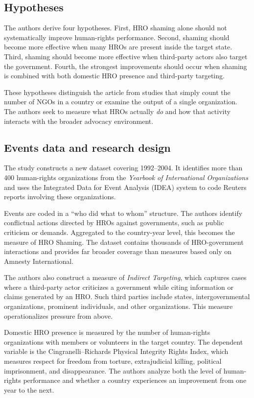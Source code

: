 \subsection{Hypotheses}

The authors derive four hypotheses. First, HRO shaming alone should not systematically improve human-rights performance. Second, shaming should become more effective when many HROs are present inside the target state. Third, shaming should become more effective when third-party actors also target the government. Fourth, the strongest improvements should occur when shaming is combined with both domestic HRO presence and third-party targeting.

These hypotheses distinguish the article from studies that simply count the number of NGOs in a country or examine the output of a single organization. The authors seek to measure what HROs actually \textit{do} and how that activity interacts with the broader advocacy environment.

\subsection{Events data and research design}

The study constructs a new dataset covering 1992--2004. It identifies more than 400 human-rights organizations from the \textit{Yearbook of International Organizations} and uses the Integrated Data for Event Analysis (IDEA) system to code Reuters reports involving these organizations.

Events are coded in a ``who did what to whom'' structure. The authors identify conflictual actions directed by HROs against governments, such as public criticism or demands. Aggregated to the country-year level, this becomes the measure of HRO Shaming. The dataset contains thousands of HRO-government interactions and provides far broader coverage than measures based only on Amnesty International.

The authors also construct a measure of \textit{Indirect Targeting}, which captures cases where a third-party actor criticizes a government while citing information or claims generated by an HRO. Such third parties include states, intergovernmental organizations, prominent individuals, and other organizations. This measure operationalizes pressure from above.

Domestic HRO presence is measured by the number of human-rights organizations with members or volunteers in the target country. The dependent variable is the Cingranelli--Richards Physical Integrity Rights Index, which measures respect for freedom from torture, extrajudicial killing, political imprisonment, and disappearance. The authors analyze both the level of human-rights performance and whether a country experiences an improvement from one year to the next.

